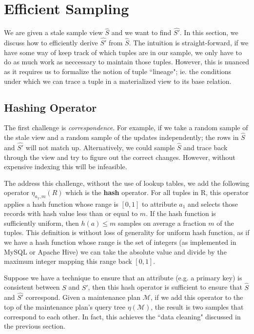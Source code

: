 \section{Efficient Sampling}
We are given a stale sample view $\hat{S}$ and we want to find $\hat{S'}$.
In this section, we discuss how to efficiently derive $\hat{S'}$ from $\hat{S}$.
The intuition is straight-forward, if we have some way of keep track of which tuples are in our sample, we only have to do as much work as neccessary to maintain those tuples. 
However, this is nuanced as it requires us to formalize the notion of tuple ``lineage"; ie. the conditions under which we can trace a tuple in a materialized view to its base relation.

\subsection{Hashing Operator}
The first challenge is \emph{correspondence}. 
For example, if we take a random sample of the stale view and a random sample of the updates independently; the rows in $\hat{S}$ and $\hat{S'}$ will not match up.
Alternatively, we could sample $\hat{S}$ and trace back through the view and try to figure out the correct changes.
However, without expensive indexing this will be infeasible.

The address this challenge, without the use of lookup tables, we add the following operator $\eta_{a_1, m}(R)$ which is the \textbf{hash} operator.
For all tuples in R, this operator applies a hash function whose range is $[0,1]$ to attribute $a_1$ and selects those records with hash value less than or equal to $m$.
If the hash function is sufficiently uniform, then $h(a) \le m$ samples on average a fraction $m$ of the tuples.
This definition is without loss of generality for uniform hash function, as if we have a hash function whose range is the set of integers (as implemented in MySQL or Apache Hive) we can take the absolute value and divide by the maximum integer mapping this range back $[0,1]$.

Suppose we have a technique to ensure that an attribute (e.g. a primary key) is consistent between $S$ and $S'$, then this hash operator is sufficient to ensure that $\hat{S}$ and $\hat{S'}$ correspond.
Given a maintenance plan $\mathcal{M}$, if we add this operator to the top of the maintenance plan's query tree $\eta(\mathcal{M})$,
the result is two samples that correspond to each other. 
In fact, this achieves the ``data cleaning" discussed in the previous section.

